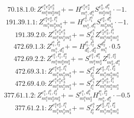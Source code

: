 \documentclass[letterpaper,10pt,fleqn,leqno,onecolumn]{article}
\begin{document}
\begin{equation} \;\;\;\;\;\;  70.18.1.0: Z^{e_{1}^{a}e_{2}^{a}e_{3}^{a}}_{m_{1}^{a}m_{2}^{a}m_{3}^{a}}+=H^{e_{1}^{a}e_{2}^{a}}_{m_{1}^{a},d_{1}^{a}}S^{e_{3}^{a},d_{1}^{a}}_{m_{2}^{a}m_{3}^{a}}\cdot -1. \end{equation}
\begin{equation} \;\;\;\;\;\;  191.39.1.1: Z^{e_{1}^{a}e_{2}^{a},l_{1}^{a}}_{m_{1}^{a}m_{2}^{a}m_{3}^{a}}+=H^{e_{1}^{a},l_{1}^{a}}_{m_{1}^{a},d_{1}^{a}}S^{e_{2}^{a},d_{1}^{a}}_{m_{2}^{a}m_{3}^{a}}\cdot -1. \end{equation}
\begin{equation} \;\;\;\;\;\;  191.39.2.0: Z^{e_{1}^{a}e_{2}^{a}e_{3}^{a}}_{m_{1}^{a}m_{2}^{a}m_{3}^{a}}+=S^{e_{1}^{a}}_{l_{1}^{a}}Z^{e_{2}^{a}e_{3}^{a},l_{1}^{a}}_{m_{1}^{a}m_{2}^{a}m_{3}^{a}} \end{equation}
\begin{equation} \;\;\;\;\;\;  472.69.1.3: Z^{l_{1}^{a},l_{2}^{a}}_{m_{1}^{a},d_{1}^{a}}+=H^{l_{1}^{a},l_{2}^{a}}_{d_{1}^{a},d_{2}^{a}}S^{d_{2}^{a}}_{m_{1}^{a}}\cdot 0.5 \end{equation}
\begin{equation} \;\;\;\;\;\;  472.69.2.2: Z^{e_{1}^{a},l_{1}^{a},l_{2}^{a}}_{m_{1}^{a}m_{2}^{a}m_{3}^{a}}+=S^{e_{1}^{a},d_{1}^{a}}_{m_{1}^{a}m_{2}^{a}}Z^{l_{1}^{a},l_{2}^{a}}_{m_{3}^{a},d_{1}^{a}} \end{equation}
\begin{equation} \;\;\;\;\;\;  472.69.3.1: Z^{e_{1}^{a}e_{2}^{a},l_{1}^{a}}_{m_{1}^{a}m_{2}^{a}m_{3}^{a}}+=S^{e_{1}^{a}}_{l_{2}^{a}}Z^{e_{2}^{a},l_{1}^{a},l_{2}^{a}}_{m_{1}^{a}m_{2}^{a}m_{3}^{a}} \end{equation}
\begin{equation} \;\;\;\;\;\;  472.69.4.0: Z^{e_{1}^{a}e_{2}^{a}e_{3}^{a}}_{m_{1}^{a}m_{2}^{a}m_{3}^{a}}+=S^{e_{1}^{a}}_{l_{1}^{a}}Z^{e_{2}^{a}e_{3}^{a},l_{1}^{a}}_{m_{1}^{a}m_{2}^{a}m_{3}^{a}} \end{equation}
\begin{equation} \;\;\;\;\;\;  377.61.1.2: Z^{e_{1}^{a},l_{1}^{a},l_{2}^{a}}_{m_{1}^{a}m_{2}^{a}m_{3}^{a}}+=S^{e_{1}^{a},d_{1}^{a}}_{m_{1}^{a}m_{2}^{a}}H^{l_{1}^{a},l_{2}^{a}}_{m_{3}^{a},d_{1}^{a}}\cdot -0.5 \end{equation}
\begin{equation} \;\;\;\;\;\;  377.61.2.1: Z^{e_{1}^{a}e_{2}^{a},l_{1}^{a}}_{m_{1}^{a}m_{2}^{a}m_{3}^{a}}+=S^{e_{1}^{a}}_{l_{2}^{a}}Z^{e_{2}^{a},l_{1}^{a},l_{2}^{a}}_{m_{1}^{a}m_{2}^{a}m_{3}^{a}} \end{equation}
\end{document}
